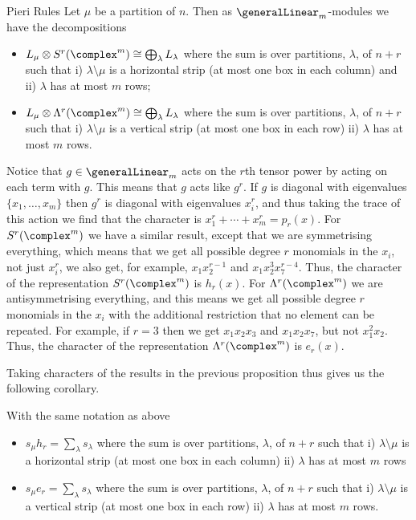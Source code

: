 \documentclass[fleqn]{NotesClass}
\newcommand{\isomorphic}{\cong}
\begin{document}
    \begin{prp}{Pieri Rules}{}
        Let \(\mu\) be a partition of \(n\).
        Then as \(\generalLinear_m\)-modules we have the decompositions
        \begin{itemize}
            \item \(L_\mu \otimes S^r(\complex^m) \isomorphic \bigoplus_\lambda L_\lambda\) where the sum is over partitions, \(\lambda\), of \(n + r\) such that i) \(\lambda \setminus \mu\) is a horizontal strip (at most one box in each column) and ii) \(\lambda\) has at most \(m\) rows;
            \item \(L_\mu \otimes \Lambda^r(\complex^m) \isomorphic \bigoplus_\lambda L_\lambda\) where the sum is over partitions, \(\lambda\), of \(n + r\) such that i) \(\lambda \setminus \mu\) is a vertical strip (at most one box in each row) ii) \(\lambda\) has at most \(m\) rows.
        \end{itemize}
    \end{prp}
    
    Notice that \(g \in \generalLinear_m\) acts on the \(r\)th tensor power by acting on each term with \(g\).
    This means that \(g\) acts like \(g^r\).
    If \(g\) is diagonal with eigenvalues \(\{x_1, \dotsc, x_m\}\) then \(g^r\) is diagonal with eigenvalues \(x_i^r\), and thus taking the trace of this action we find that the character is \(x_1^r + \dotsb + x_m^r = p_r(x)\).
    For \(S^r(\complex^m)\) we have a similar result, except that we are symmetrising everything, which means that we get all possible degree \(r\) monomials in the \(x_i\), not just \(x_i^r\), we also get, for example, \(x_1x_2^{r-1}\) and \(x_1 x_2^3 x_7^{r-4}\).
    Thus, the character of the representation \(S^r(\complex^m)\) is \(h_r(x)\).
    For \(\Lambda^r(\complex^m)\) we are antisymmetrising everything, and this means we get all possible degree \(r\) monomials in the \(x_i\) with the additional restriction that no element can be repeated.
    For example, if \(r = 3\) then we get \(x_1x_2x_3\) and \(x_1 x_2 x_7\), but not \(x_1^2x_2\).
    Thus, the character of the representation \(\Lambda^r(\complex^m)\) is \(e_r(x)\).
    
    Taking characters of the results in the previous proposition thus gives us the following corollary.
    
    \begin{crl}{}{}
        With the same notation as above
        \begin{itemize}
            \item \(s_\mu h_r = \sum_\lambda s_\lambda\) where the sum is over partitions, \(\lambda\), of \(n + r\) such that i) \(\lambda \setminus \mu\) is a horizontal strip (at most one box in each column) ii) \(\lambda\) has at most \(m\) rows
            \item \(s_\mu e_r = \sum_\lambda s_\lambda\) where the sum is over partitions, \(\lambda\), of \(n + r\) such that i) \(\lambda \setminus \mu\) is a vertical strip (at most one box in each row) ii) \(\lambda\) has at most \(m\) rows.
        \end{itemize}
    \end{crl}
    
\end{document}
